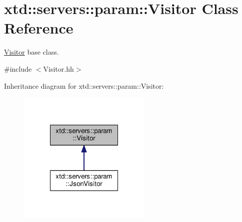 \hypertarget{classxtd_1_1servers_1_1param_1_1Visitor}{\section{xtd\-:\-:servers\-:\-:param\-:\-:Visitor Class Reference}
\label{classxtd_1_1servers_1_1param_1_1Visitor}
}


\hyperlink{classxtd_1_1servers_1_1param_1_1Visitor}{Visitor} base class.  




{\ttfamily \#include $<$Visitor.\-hh$>$}



Inheritance diagram for xtd\-:\-:servers\-:\-:param\-:\-:Visitor\-:
\nopagebreak
\begin{figure}[H]
\begin{center}
\leavevmode
\includegraphics[width=180pt]{classxtd_1_1servers_1_1param_1_1Visitor__inherit__graph}
\end{center}
\end{figure}
